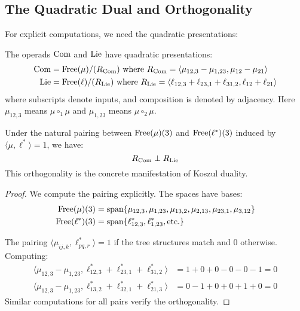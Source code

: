 \subsection{The Quadratic Dual and Orthogonality}
 
For explicit computations, we need the quadratic presentations:
 
\begin{proposition}
The operads $\operatorname{Com}$ and $\operatorname{Lie}$ have quadratic presentations:
\begin{align}
\operatorname{Com} &= \operatorname{Free}(\mu)/(R_{\operatorname{Com}}) \text{ where } R_{\operatorname{Com}} = \langle \mu_{12,3} - \mu_{1,23}, \mu_{12} - \mu_{21} \rangle \\
\operatorname{Lie} &= \operatorname{Free}(\ell)/(R_{\operatorname{Lie}}) \text{ where } R_{\operatorname{Lie}} = \langle \ell_{12,3} + \ell_{23,1} + \ell_{31,2}, \ell_{12} + \ell_{21} \rangle
\end{align}
where subscripts denote inputs, and composition is denoted by adjacency. Here $\mu_{12,3}$ means $\mu \circ_1 \mu$ and $\mu_{1,23}$ means $\mu \circ_2 \mu$.
\end{proposition}
 
\begin{proposition}[Orthogonality]\label{prop:orthogonal}
Under the natural pairing between $\operatorname{Free}(\mu)(3)$ and $\operatorname{Free}(\ell^*)(3)$ induced by $\langle \mu, \ell^* \rangle = 1$, we have:
\[
R_{\operatorname{Com}} \perp R_{\operatorname{Lie}}
\]
This orthogonality is the concrete manifestation of Koszul duality.
\end{proposition}
 
\begin{proof}
We compute the pairing explicitly. The spaces have bases:
\begin{align}
\operatorname{Free}(\mu)(3) &= \text{span}\{\mu_{12,3}, \mu_{1,23}, \mu_{13,2}, \mu_{2,13}, \mu_{23,1}, \mu_{3,12}\} \\
\operatorname{Free}(\ell^*)(3) &= \text{span}\{\ell^*_{12,3}, \ell^*_{1,23}, \text{etc.}\}
\end{align}
 
The pairing $\langle \mu_{ij,k}, \ell^*_{pq,r} \rangle = 1$ if the tree structures match and $0$ otherwise. Computing:
\begin{align}
\langle \mu_{12,3} - \mu_{1,23}, \ell^*_{12,3} + \ell^*_{23,1} + \ell^*_{31,2} \rangle &= 1 + 0 + 0 - 0 - 0 - 1 = 0 \\
\langle \mu_{12,3} - \mu_{1,23}, \ell^*_{13,2} + \ell^*_{32,1} + \ell^*_{21,3} \rangle &= 0 - 1 + 0 + 0 + 1 + 0 = 0
\end{align}
Similar computations for all pairs verify the orthogonality.
\end{proof}
 
